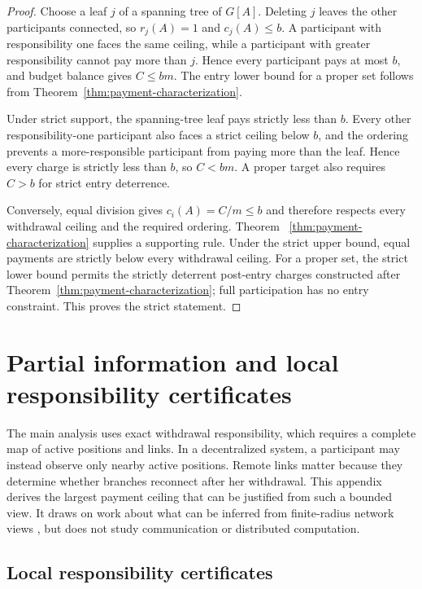 \documentclass[preprint,12pt,authoryear]{elsarticle}
\begin{document}
\begin{proof}
Choose a leaf \(j\) of a spanning tree of \(G[A]\). Deleting \(j\) leaves the
other participants connected, so \(r_j(A)=1\) and \(c_j(A)\leq b\). A
participant with responsibility one faces the same ceiling, while a
participant with greater responsibility cannot pay more than \(j\). Hence
every participant pays at most \(b\), and budget balance gives \(C\leq bm\).
The entry lower bound for a proper set follows from
Theorem~\ref{thm:payment-characterization}.

Under strict support, the spanning-tree leaf pays strictly less than \(b\).
Every other responsibility-one participant also faces a strict ceiling below
\(b\), and the ordering prevents a more-responsible participant from paying
more than the leaf. Hence every charge is strictly less than \(b\), so
\(C<bm\). A proper target also requires \(C>b\) for strict entry deterrence.

Conversely, equal division gives \(c_i(A)=C/m\leq b\) and therefore respects
every withdrawal ceiling and the required ordering. Theorem~
\ref{thm:payment-characterization} supplies a supporting rule. Under the strict
upper bound, equal payments are strictly below every withdrawal ceiling. For a
proper set, the strict lower bound permits the strictly deterrent post-entry
charges constructed after Theorem~\ref{thm:payment-characterization}; full
participation has no entry constraint. This proves the strict statement.
\end{proof}

\section{Partial information and local responsibility certificates}
\label{app:partial-information}

The main analysis uses exact withdrawal responsibility, which requires a
complete map of active positions and links. In a decentralized system, a
participant may instead observe only nearby active positions. Remote links
matter because they determine whether branches reconnect after her withdrawal.
This appendix derives the largest payment ceiling that can be justified from
such a bounded view. It draws on work about what can be inferred from
finite-radius network views \citep{Angluin1980,Linial1992}, but does not study
communication or distributed computation.

\subsection{Local responsibility certificates}
\end{document}
